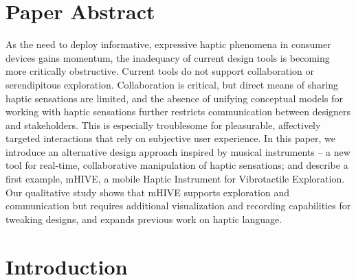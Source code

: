 




\section{Paper Abstract}
As the need to deploy informative, expressive haptic phenomena in consumer devices gains momentum, the inadequacy of current design tools is becoming more critically obstructive.
Current tools do not support collaboration or serendipitous exploration.
Collaboration is critical,
but direct means of sharing haptic sensations are limited,
and the absence of unifying conceptual models for working with haptic sensations further restricts communication between designers and stakeholders.
This is especially troublesome for pleasurable, affectively targeted interactions that rely on 
subjective user experience.
In this paper, we introduce an alternative design approach
inspired by musical instruments -- a new tool for real-time, collaborative manipulation of haptic sensations;
and describe 
a first example, mHIVE, a mobile Haptic Instrument for Vibrotactile Exploration.
Our qualitative study shows that mHIVE supports exploration and communication but
requires additional visualization and recording capabilities for tweaking designs,
and expands previous work on haptic language.





\section{Introduction}

